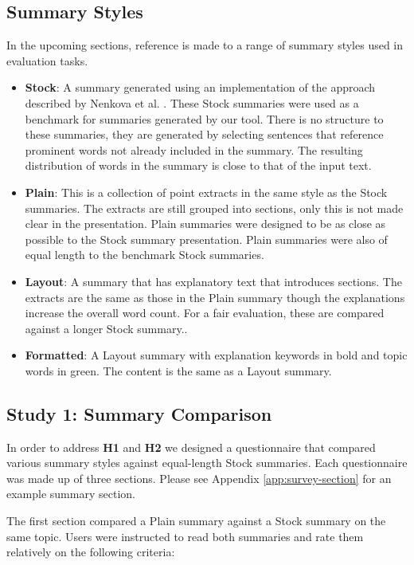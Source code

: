     \tocless\subsection{Summary Styles}
      In the upcoming sections, reference is made to a range of summary styles used in evaluation tasks.
      \begin{itemize}
        \item{\textbf{Stock}: A summary generated using an implementation of the approach described by Nenkova et al. \cite{nenkova2006compositional}. These Stock summaries were used as a benchmark for summaries generated by our tool. There is no structure to these summaries, they are generated by selecting sentences that reference prominent words not already included in the summary. The resulting distribution of words in the summary is close to that of the input text.}
        \item{\textbf{Plain}: This is a collection of point extracts in the same style as the Stock summaries. The extracts are still grouped into sections, only this is not made clear in the presentation. Plain summaries were designed to be as close as possible to the Stock summary presentation. Plain summaries were also of equal length to the benchmark Stock summaries.}
        \item{\textbf{Layout}: A summary that has explanatory text that introduces sections. The extracts are the same as those in the Plain summary though the explanations increase the overall word count. For a fair evaluation, these are compared against a longer Stock summary..}
        \item{\textbf{Formatted}: A Layout summary with explanation keywords in bold and topic words in green. The content is the same as a Layout summary.}
      \end{itemize}

    \tocless\subsection{Study 1: Summary Comparison\label{sec:stud1}}
      In order to address \textbf{H1} and \textbf{H2} we designed a questionnaire that compared various summary styles against equal-length Stock summaries. Each questionnaire was made up of three sections. Please see Appendix \ref{app:survey-section} for an example summary section.

      The first section compared a Plain summary against a Stock summary on the same topic. Users were instructed to read both summaries and rate them relatively on the following criteria:


